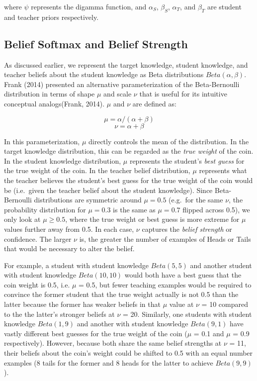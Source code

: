 \documentclass[10pt, letterpaper]{article}
\begin{document}
\noindent where \(\psi\) represents the digamma function, and
\(\alpha_S\), \(\beta_S\), \(\alpha_T\), and \(\beta_T\) are student and
teacher priors respectively.

\subsection{Belief Softmax and Belief
Strength}\label{belief-softmax-and-belief-strength}

As discussed earlier, we represent the target knowledge, student
knowledge, and teacher beliefs about the student knowledge as Beta
distributions \(Beta(\alpha, \beta)\). Frank (2014) presented an
alternative parameterization of the Beta-Bernoulli distribution in terms
of shape \(\mu\) and scale \(\nu\) that is useful for its intuitive
conceptual analogs(Frank, 2014). \(\mu\) and \(\nu\) are defined as:

\[\mu = \alpha / (\alpha + \beta)\] \[\nu = \alpha + \beta\]

In this parameterization, \(\mu\) directly controls the mean of the
distribution. In the target knowledge distribution, this can be regarded
as the \emph{true weight} of the coin. In the student knowledge
distribution, \(\mu\) represents the student's \emph{best guess} for the
true weight of the coin. In the teacher belief distribution, \(\mu\)
represents what the teacher believes the student's best guess for the
true weight of the coin would be (i.e.~given the teacher belief about
the student knowledge). Since Beta-Bernoulli distributions are symmetric
around \(\mu = 0.5\) (e.g.~for the same \(\nu\), the probability
distribution for \(\mu = 0.3\) is the same as \(\mu = 0.7\) flipped
across 0.5), we only look at \(\mu \geq 0.5\), where the true weight or
best guess is more extreme for \(\mu\) values further away from 0.5. In
each case, \(\nu\) captures the \emph{belief strength} or confidence.
The larger \(\nu\) is, the greater the number of examples of Heads or
Tails that would be necessary to alter the belief.

For example, a student with student knowledge \(Beta(5,5)\) and another
student with student knowledge \(Beta(10,10)\) would both have a best
guess that the coin weight is 0.5, i.e. \(\mu\) = 0.5, but fewer
teaching examples would be required to convince the former student that
the true weight actually is not 0.5 than the latter because the former
has weaker beliefs in that \(\mu\) value at \(\nu\) = 10 compared to the
the latter's stronger beliefs at \(\nu\) = 20. Similarly, one students
with student knowledge \(Beta(1,9)\) and another with student knowledge
\(Beta(9,1)\) have vastly different best guesses for the true weight of
the coin (\(\mu\) = 0.1 and \(\mu\) = 0.9 respectively). However,
because both share the same belief strengths at \(\nu\) = 11, their
beliefs about the coin's weight could be shifted to 0.5 with an equal
number examples (8 tails for the former and 8 heads for the latter to
achieve \(Beta(9,9)\)).
\end{document}
